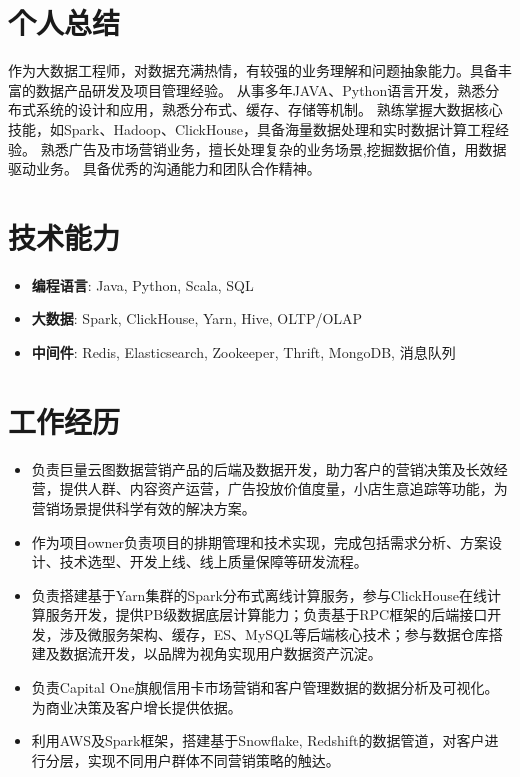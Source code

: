 \documentclass{resume}
\begin{document}

 
\section{个人总结}
作为大数据工程师，对数据充满热情，有较强的业务理解和问题抽象能力。具备丰富的数据产品研发及项目管理经验。
从事多年JAVA、Python语言开发，熟悉分布式系统的设计和应用，熟悉分布式、缓存、存储等机制。
熟练掌握大数据核心技能，如Spark、Hadoop、ClickHouse，具备海量数据处理和实时数据计算工程经验。
熟悉广告及市场营销业务，擅长处理复杂的业务场景,挖掘数据价值，用数据驱动业务。
具备优秀的沟通能力和团队合作精神。

\section{技术能力}
\begin{itemize}[parsep=0.2ex]
  \item \textbf{编程语言}: Java, Python, Scala, SQL
  \item \textbf{大数据}: Spark, ClickHouse, Yarn, Hive, OLTP/OLAP
  \item \textbf{中间件}: Redis, Elasticsearch, Zookeeper, Thrift, MongoDB, 消息队列
\end{itemize}

\section{工作经历}
\begin{itemize}
  \item 负责巨量云图数据营销产品的后端及数据开发，助力客户的营销决策及长效经营，提供人群、内容资产运营，广告投放价值度量，小店生意追踪等功能，为营销场景提供科学有效的解决方案。
  \item 作为项目owner负责项目的排期管理和技术实现，完成包括需求分析、方案设计、技术选型、开发上线、线上质量保障等研发流程。
  \item 负责搭建基于Yarn集群的Spark分布式离线计算服务，参与ClickHouse在线计算服务开发，提供PB级数据底层计算能力；负责基于RPC框架的后端接口开发，涉及微服务架构、缓存，ES、MySQL等后端核心技术；参与数据仓库搭建及数据流开发，以品牌为视角实现用户数据资产沉淀。
\end{itemize}

\begin{itemize}
  \item 负责Capital One旗舰信用卡市场营销和客户管理数据的数据分析及可视化。为商业决策及客户增长提供依据。
  \item 利用AWS及Spark框架，搭建基于Snowflake, Redshift的数据管道，对客户进行分层，实现不同用户群体不同营销策略的触达。
\end{itemize}
\end{document}
